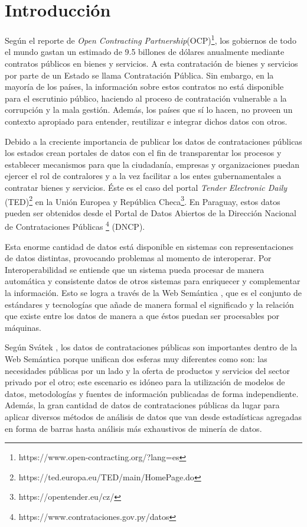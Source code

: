 \chapter{Introducción}
\label{chap:introduccion}




Según el reporte de \textit{Open Contracting Partnership}(OCP)\footnote{https://www.open-contracting.org/?lang=es}, los gobiernos de todo el mundo gastan un estimado de 9.5 billones de dólares anualmente mediante contratos públicos en bienes y servicios. A esta contratación de bienes y servicios por parte de un Estado se llama Contratación Pública.  Sin embargo, en la mayoría de los países, la información sobre estos contratos no está disponible para el escrutinio público, haciendo al proceso de contratación vulnerable a la corrupción y la mala gestión. Además, los países que sí lo hacen, no proveen un contexto apropiado para entender, reutilizar e integrar dichos datos con otros.

Debido a la creciente importancia de publicar los datos de contrataciones públicas los estados crean portales de datos con el fin de transparentar los procesos y establecer mecanismos para que la ciudadanía, empresas y organizaciones puedan ejercer el rol de contralores y a la vez facilitar a los entes gubernamentales a contratar bienes y servicios. Éste es el caso del portal \textit{Tender Electronic Daily} (TED)\footnote{https://ted.europa.eu/TED/main/HomePage.do}  en la Unión Europea y República Checa\footnote{https://opentender.eu/cz/}. En Paraguay, estos datos pueden ser obtenidos desde el Portal de Datos Abiertos de la Dirección Nacional de Contrataciones Públicas \footnote{https://www.contrataciones.gov.py/datos} (DNCP).

Esta enorme cantidad de datos está disponible en sistemas con representaciones de datos distintas, provocando problemas al momento de interoperar. Por Interoperabilidad se entiende que un sistema pueda procesar de manera automática y consistente datos de otros sistemas para enriquecer y complementar la información. Esto se logra a través de la Web Semántica \cite{Semantic20:online}, que es el conjunto de estándares y tecnologías que añade de manera formal el significado y la relación que existe entre los datos de manera a que éstos puedan ser procesables por máquinas.

Según Svátek \cite{svatek2014linked}, los datos de contrataciones públicas son importantes dentro de la Web Semántica \cite{Semantic20:online} porque unifican dos esferas muy diferentes como son: las necesidades públicas por un lado y la oferta de productos y servicios del sector privado por el otro; este escenario es idóneo para la utilización de modelos de datos, metodologías y fuentes de información publicadas de forma independiente. Además, la gran cantidad de datos de contrataciones públicas da lugar para aplicar diversos métodos de análisis de datos que van desde estadísticas agregadas en forma de barras hasta análisis más exhaustivos de minería de datos.



